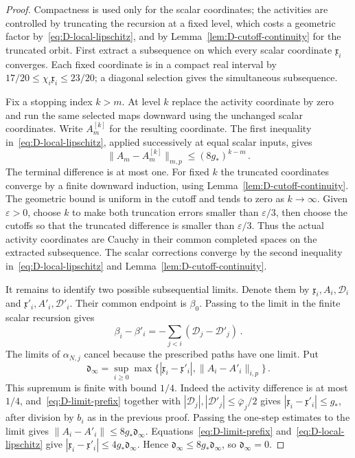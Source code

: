 \begin{proof}
Compactness is used only for the scalar coordinates; the activities are controlled by truncating the recursion at a fixed level, which costs a geometric factor by~\eqref{eq:D-local-lipschitz}, and by Lemma~\ref{lem:D-cutoff-continuity} for the truncated orbit. First extract a subsequence on which every scalar coordinate $\mathfrak x_i$ converges. Each fixed coordinate is in a compact real interval by $17/20\le\chi_i \mathfrak x_i\le23/20$; a diagonal selection gives the simultaneous subsequence.

Fix a stopping index $k>m$. At level $k$ replace the activity coordinate by zero and run the same selected maps downward using the unchanged scalar coordinates. Write $A_m^{[k]}$ for the resulting coordinate. The first inequality in~\eqref{eq:D-local-lipschitz}, applied successively at equal scalar inputs, gives
\begin{equation}\label{eq:D-truncated-orbit}
\|A_m-A_m^{[k]}\|_{m,p}\le(8g_*)^{k-m}\,.
\end{equation}
The terminal difference is at most one. For fixed $k$ the truncated coordinates converge by a finite downward induction, using Lemma~\ref{lem:D-cutoff-continuity}. The geometric bound is uniform in the cutoff and tends to zero as $k\to\infty$. Given $\varepsilon>0$, choose $k$ to make both truncation errors smaller than $\varepsilon/3$, then choose the cutoffs so that the truncated difference is smaller than $\varepsilon/3$. Thus the actual activity coordinates are Cauchy in their common completed spaces on the extracted subsequence. The scalar corrections converge by the second inequality in~\eqref{eq:D-local-lipschitz} and Lemma~\ref{lem:D-cutoff-continuity}.

It remains to identify two possible subsequential limits. Denote them by $\mathfrak x_i,A_i,\mathcal D_i$ and $\mathfrak x'_i,A'_i,\mathcal D'_i$. Their common endpoint is $\beta_0$. Passing to the limit in the finite scalar recursion gives
\begin{equation}\label{eq:D-limit-prefix}
\beta_i-\beta'_i=-\sum_{j<i}(\mathcal D_j-\mathcal D'_j)\,.
\end{equation}
The limits of $\alpha_{N,j}$ cancel because the prescribed paths have one limit. Put
\begin{equation*}
\mathfrak d_\infty=\sup_{i\ge0}\max\{|\mathfrak x_i-\mathfrak x'_i|,\|A_i-A'_i\|_{i,p}\}\,.
\end{equation*}
This supremum is finite with bound $1/4$. Indeed the activity difference is at most $1/4$, and~\eqref{eq:D-limit-prefix} together with $|\mathcal D_j|,|\mathcal D'_j|\le \bar\varphi_j/2$ gives $|\mathfrak x_i-\mathfrak x'_i|\le g_*$, after division by $b_i$ as in the previous proof. Passing the one-step estimates to the limit gives $\|A_i-A'_i\|\le8g_*\mathfrak d_\infty$. Equations~\eqref{eq:D-limit-prefix} and~\eqref{eq:D-local-lipschitz} give $|\mathfrak x_i-\mathfrak x'_i|\le4g_*\mathfrak d_\infty$. Hence $\mathfrak d_\infty\le8g_*\mathfrak d_\infty$, so $\mathfrak d_\infty=0$.


\end{proof}
